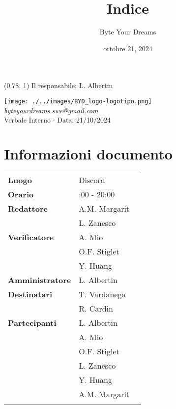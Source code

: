 \documentclass{article}
\title{\textbf{\fontsize{28}{6}\selectfont Indice}}
\author{\fontsize{14}{6}\selectfont Byte Your Dreams}
\date{ottobre 21, 2024}
\begin{document}
\begin{textblock*}{\textwidth}(0.78\textwidth, 1\textheight)
    Il responsabile: L. Albertin
\end{textblock*}
\pagestyle{fancy}
\begin{center}
\texttt{[image: ./../images/BYD\_logo-logotipo.png]} \\
\fontsize{12}{6}\textcolor[RGB]{60, 60, 60}{\textit{byteyourdreams.swe@gmail.com}} \\
\vspace{0.5cm}
\fontsize{16}{6}\selectfont Verbale Interno $\cdot$ Data: 21/10/2024 \\
\vspace{0.5cm}
\end{center}




\section*{Informazioni documento}
\def\arraystretch{1.2}
\begin{tabular}{>{\raggedleft\arraybackslash}p{}|>{\raggedright\arraybackslash}p{}c}
\hline
\addlinespace
\textbf{Luogo} & Discord \vspace{10pt} \\
\textbf{Orario} & 18:00 - 20:00 \vspace{10pt} \\
\textbf{Redattore} & A.M. Margarit \\ & L. Zanesco \vspace{10pt} \\
\textbf{Verificatore} & A. Mio \\ & O.F. Stiglet \\ & Y. Huang \vspace{10pt} \\
\textbf{Amministratore} & L. Albertin \vspace{10pt} \\
\textbf{Destinatari} & T. Vardanega \\ & R. Cardin \vspace{10pt} \\
\textbf{Partecipanti} & L. Albertin \\ & A. Mio \\ & O.F. Stiglet \\ & L. Zanesco \\ & Y. Huang\\ & A.M. Margarit \\\vspace{10pt} \\
\end{tabular}
\end{document}
